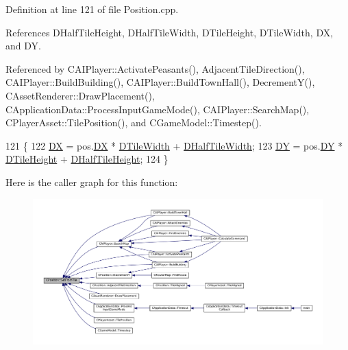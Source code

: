 Definition at line 121 of file Position.\+cpp.



References D\+Half\+Tile\+Height, D\+Half\+Tile\+Width, D\+Tile\+Height, D\+Tile\+Width, DX, and DY.



Referenced by C\+A\+I\+Player\+::\+Activate\+Peasants(), Adjacent\+Tile\+Direction(), C\+A\+I\+Player\+::\+Build\+Building(), C\+A\+I\+Player\+::\+Build\+Town\+Hall(), Decrement\+Y(), C\+Asset\+Renderer\+::\+Draw\+Placement(), C\+Application\+Data\+::\+Process\+Input\+Game\+Mode(), C\+A\+I\+Player\+::\+Search\+Map(), C\+Player\+Asset\+::\+Tile\+Position(), and C\+Game\+Model\+::\+Timestep().


\begin{DoxyCode}
121                                                \{
122     \hyperlink{classCPosition_a28445f9b872169715919074d82044eda}{DX} = pos.\hyperlink{classCPosition_a28445f9b872169715919074d82044eda}{DX} * \hyperlink{classCPosition_ac17d12fb5d35fcf62d63bb42e8cf7ed6}{DTileWidth} + \hyperlink{classCPosition_a3227e835d9008346e9d91bdad2380f14}{DHalfTileWidth};
123     \hyperlink{classCPosition_a84139c9e8eb547e7cf3cb851739943a4}{DY} = pos.\hyperlink{classCPosition_a84139c9e8eb547e7cf3cb851739943a4}{DY} * \hyperlink{classCPosition_a202ebb83e86df75cfb76cf1241ba817c}{DTileHeight} + \hyperlink{classCPosition_a1e0af68f7690b3cfc14687cf7fbe7ade}{DHalfTileHeight};
124 \}
\end{DoxyCode}
Here is the caller graph for this function\+:
\nopagebreak
\begin{figure}[H]
\begin{center}
\leavevmode
\includegraphics[width=350pt]{classCPosition_a46994e6a8b8e3b4237edd7259ad844b6_icgraph}
\end{center}
\end{figure}
\hypertarget{classCPosition_a506e9efd21e209e36533ba7e594be75f}{}\label{classCPosition_a506e9efd21e209e36533ba7e594be75f} 
